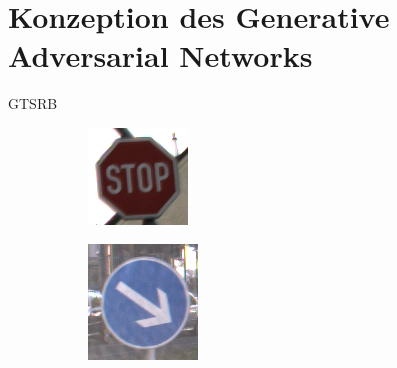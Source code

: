 \chapter{Konzeption des Generative Adversarial Networks}
\ac{GTSRB}
\begin{figure}[H]
   \centering
   \begin{subfigure}[b]{0.2\textwidth}
       \centering
       \includegraphics[height=\textwidth]{../images/GTSRB/00093.png}
       \caption{}
       \label{fig:gtrsb-paper-bsp-image-1}
   \end{subfigure}
   \hspace{2em}%
   \begin{subfigure}[b]{0.2\textwidth}
       \centering
       \includegraphics[height=\textwidth]{../images/GTSRB/00847.png}

\end{subfigure}
\end{figure}
